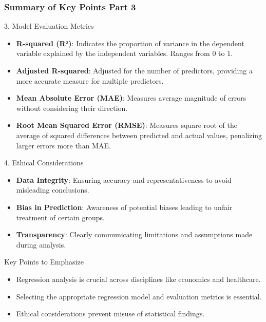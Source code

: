 \documentclass[aspectratio=169]{beamer}
\begin{document}
\begin{frame}[fragile]
    \frametitle{Summary of Key Points Part 3}
    \begin{block}{3. Model Evaluation Metrics}
        \begin{itemize}
            \item \textbf{R-squared (R²)}: Indicates the proportion of variance in the dependent variable explained by the independent variables. Ranges from 0 to 1.
            \item \textbf{Adjusted R-squared}: Adjusted for the number of predictors, providing a more accurate measure for multiple predictors.
            \item \textbf{Mean Absolute Error (MAE)}: Measures average magnitude of errors without considering their direction.
            \item \textbf{Root Mean Squared Error (RMSE)}: Measures square root of the average of squared differences between predicted and actual values, penalizing larger errors more than MAE.
        \end{itemize}
    \end{block}
    
    \begin{block}{4. Ethical Considerations}
        \begin{itemize}
            \item \textbf{Data Integrity}: Ensuring accuracy and representativeness to avoid misleading conclusions.
            \item \textbf{Bias in Prediction}: Awareness of potential biases leading to unfair treatment of certain groups.
            \item \textbf{Transparency}: Clearly communicating limitations and assumptions made during analysis.
        \end{itemize}
    \end{block}
    
    \begin{block}{Key Points to Emphasize}
        \begin{itemize}
            \item Regression analysis is crucial across disciplines like economics and healthcare.
            \item Selecting the appropriate regression model and evaluation metrics is essential.
            \item Ethical considerations prevent misuse of statistical findings.
        \end{itemize}
    \end{block}
\end{frame}
\end{document}
